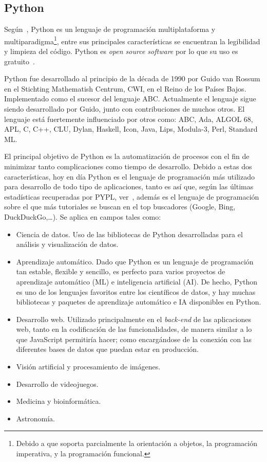 \subsection{Python}
Según~\cite{queespython}, Python es un lenguaje de programación multiplataforma y multiparadigma\footnote{Debido a que soporta parcialmente la orientación a objetos, la programación imperativa, y la programación funcional.}, entre sus principales características se encuentran la legibilidad y limpieza del código. Python es \textit{open source software} por lo que su uso es gratuito~\cite{pythonLICENSE}.

Python fue desarrollado al principio de la década de 1990 por Guido van Rossum en el Stichting Mathematish Centrum, CWI, en el Reino de los Países Bajos. Implementado como el sucesor del lenguaje ABC. Actualmente el lenguaje sigue siendo desarrollado por Guido, junto con contribuciones de muchos otros. El lenguaje está fuertemente influenciado por otros como: ABC, Ada, ALGOL 68, APL, C, C++, CLU, Dylan, Haskell, Icon, Java, Lips, Modula-3, Perl, Standard ML.

El principal objetivo de Python es la automatización de procesos con el fin de minimizar tanto complicaciones como tiempo de desarrollo. Debido a estas dos características, hoy en día Python es el lenguaje de programación más utilizado para desarrollo de todo tipo de aplicaciones, tanto es así que, según las últimas estadísticas recuperadas por PYPL, ver~\cite{pyplindex}, además es el lenguaje de programación sobre el que más tutoriales se buscan en el top buscadores (Google, Bing, DuckDuckGo,\dots). Se aplica en campos tales como:
\begin{itemize}
\item Ciencia de datos. Uso de las bibliotecas de Python desarrolladas para el análisis y visualización de datos.
\item Aprendizaje automático. Dado que Python es un lenguaje de programación tan estable, flexible y sencillo, es perfecto para varios proyectos de aprendizaje automático (ML) e inteligencia artificial (AI). De hecho, Python es uno de los lenguajes favoritos entre los científicos de datos, y hay muchas bibliotecas y paquetes de aprendizaje automático e IA disponibles en Python. 
\item Desarrollo web. Utilizado principalmente en el \textit{back-end} de las aplicaciones web, tanto en la codificación de las funcionalidades, de manera similar a lo que JavaScript permitiría hacer; como encargándose de la conexión con las diferentes bases de datos que puedan estar en producción.
\item Visión artificial y procesamiento de imágenes. 
\item Desarrollo de videojuegos.
\item Medicina y bioinformática.
\item Astronomía.
\end{itemize}


